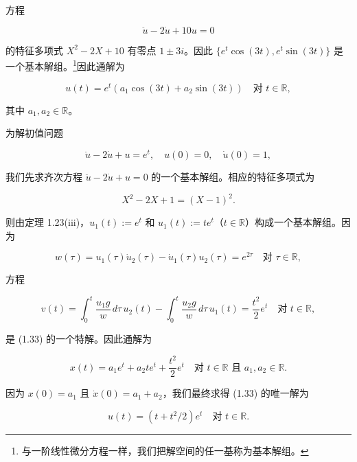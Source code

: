 \begin{example}

\begin{items}
\item

方程

\[
\ddot{u} - 2\dot{u} + 10u = 0
\]

的特征多项式 $ X^{2} - 2X + 10 $ 有零点 $ 1 \pm 3i $。因此 $ \{e^{t}\cos(3t), e^{t}\sin(3t)\} $ 是一个基本解组。\footnote{与一阶线性微分方程一样，我们把解空间的任一基称为基本解组。}因此通解为

\[
u(t) = e^{t}\left( a_{1}\cos(3t) + a_{2}\sin(3t) \right) \quad \text{对 } t \in \mathbb{R} ,
\]

其中 $ a_{1}, a_{2} \in \mathbb{R} $。

\end{items}


\begin{items}
\item[（b）]

为解初值问题

\begin{equation}
\ddot{u} - 2\dot{u} + u = e^{t} , \quad u(0) = 0 , \quad \dot{u}(0) = 1 ,\tag{1.33}
\end{equation}

我们先求齐次方程 $ \ddot{u} - 2\dot{u} + u = 0 $ 的一个基本解组。相应的特征多项式为

\[
X^{2} - 2X + 1 = (X - 1)^{2} .
\]

则由定理 1.23(iii)，$ u_{1}(t) := e^{t} $ 和 $ u_{1}(t) := te^{t} $（$ t \in \mathbb{R} $）构成一个基本解组。因为

\[
w(\tau) = u_{1}(\tau)\dot{u}_{2}(\tau) - \dot{u}_{1}(\tau)u_{2}(\tau) = e^{2\tau} \quad \text{对 } \tau \in \mathbb{R} ,
\]

方程

\[
v(t) = \int_{0}^{t}\frac{u_{1}g}{w}\,d\tau\,u_{2}(t) - \int_{0}^{t}\frac{u_{2}g}{w}\,d\tau\,u_{1}(t) = \frac{t^{2}}{2}e^{t} \quad \text{对 } t \in \mathbb{R} ,
\]

是 (1.33) 的一个特解。因此通解为

\[
x(t) = a_{1}e^{t} + a_{2}te^{t} + \frac{t^{2}}{2}e^{t} \quad \text{对 } t \in \mathbb{R} \text{ 且 } a_{1}, a_{2} \in \mathbb{R} .
\]

因为 $ x(0) = a_{1} $ 且 $ \dot{x}(0) = a_{1} + a_{2} $，我们最终求得 (1.33) 的唯一解为

\[
u(t) = (t + t^{2}/2)e^{t} \quad \text{对 } t \in \mathbb{R} .
\]
\item[（c）]


\end{items}
\end{example}
